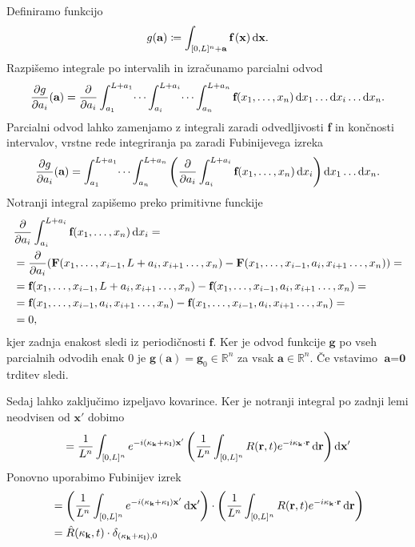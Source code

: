 \documentclass[mat2, tisk]{fmfdelo}
\newcommand{\R}{\mathbb R}
\newcommand{\bd}{\textbf}
\begin{document}
\begin{dokaz}
Definiramo funkcijo 
$$
g(\bd{a}) \coloneqq \int_{[0, L]^n + \bd{a}}\bd{f}\,(\bd{x}) \dif\bd{x}.
$$
Razpišemo integrale po intervalih in izračunamo parcialni odvod
\begin{align*}
\frac{\partial g}{\partial a_i}(\bd{a}) = \frac{\partial}{\partial a_i} \int_{a_1}^{L + a_1} \dots \int_{a_i}^{L + a_i} \dots \int_{a_n}^{L + a_n} \bd{f}(x_1, \dots, x_n) \dif x_1 \dots \dif x_i \dots  \dif x_n.
\end{align*}
Parcialni odvod lahko zamenjamo z integrali zaradi odvedljivosti \bd{f} in končnosti 
intervalov, vrstne rede integriranja pa zaradi Fubinijevega izreka 
\begin{align*}
  \frac{\partial g}{\partial a_i}(\bd{a}) = \int_{a_1}^{L + a_1} \dots \int_{a_n}^{L + a_n} \left(\frac{\partial}{\partial a_i} \int_{a_i}^{L + a_i} \bd{f}(x_1, \dots, x_n) \dif x_i \right) \dif x_1 \dots \dif x_n.
\end{align*}
Notranji integral zapišemo preko primitivne funckije 
\begin{align*}
&\frac{\partial}{\partial a_i} \int_{a_i}^{L + a_i} \bd{f}(x_1, \dots, x_n) \dif x_i = \\
&= \frac{\partial}{\partial a_i} (\bd{F}(x_1, \dots, x_{i-1}, L + a_i, x_{i+1} \dots, x_n) - \bd{F}(x_1, \dots, x_{i-1},  a_i, x_{i+1} \dots, x_n)) = \\
&= \bd{f}(x_1, \dots, x_{i-1}, L + a_i, x_{i+1} \dots, x_n) - \bd{f}(x_1, \dots, x_{i-1},  a_i, x_{i+1} \dots, x_n) = \\
&= \bd{f}(x_1, \dots, x_{i-1}, a_i, x_{i+1} \dots, x_n) - \bd{f}(x_1, \dots, x_{i-1},  a_i, x_{i+1} \dots, x_n) = \\
&= 0,
\end{align*}
kjer zadnja enakost sledi iz periodičnosti $\bd{f}$. Ker je odvod funkcije 
$\bd{g}$ po vseh parcialnih odvodih enak $0$ je $\bd{g}(\bd{a}) = \bd{g}_0 \in \R^n$  
za vsak $\bd{a} \in \R^n$. Če vstavimo $\bd{a} = \bd{0}$ trditev sledi.
\end{dokaz}
Sedaj lahko zaključimo izpeljavo kovarince. Ker je notranji integral po zadnji lemi neodvisen 
od $\bd{x}'$ dobimo 
$$
= \frac{1}{L^{n}} \int_{[0, L]^{n}} e^{-i(\bd{\text{$\kappa$}}_{\bd{k}} + \bd{\text{$\kappa$}}_{\bd{l}})\bd{x}'}\left(\frac{1}{L^n}\int_{[0, L]^{n}} R(\bd{r}, t) e^{-i\bd{\text{$\kappa$}}_{\bd{k}} \cdot \bd{r}} \dif\bd{r}\right) \dif\bd{x}'
$$
Ponovno uporabimo Fubinijev izrek 
\begin{align*}
&= \left(\frac{1}{L^{n}} \int_{[0, L]^{n}} e^{-i(\bd{\text{$\kappa$}}_{\bd{k}} + \bd{\text{$\kappa$}}_{\bd{l}})\bd{x}'} \dif\bd{x}' \right) \cdot\left(\frac{1}{L^n}\int_{[0, L]^{n}} R(\bd{r}, t) e^{-i\bd{\text{$\kappa$}}_{\bd{k}} \cdot \bd{r}} \dif\bd{r}\right) \\
&= \hat{R}(\text{\bd{$\kappa$}}_{\bd{k}}, t) \cdot \delta_{(\bd{\text{$\kappa$}}_{\bd{k}} + \bd{\text{$\kappa$}}_{\bd{l}}), 0}
\end{align*}
\end{document}
